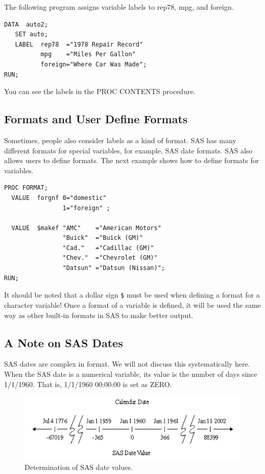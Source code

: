 \documentclass[
]{book}
\begin{document}
The following program assigns variable labels to rep78, mpg, and foreign.

\begin{verbatim}
DATA  auto2;
   SET auto;
   LABEL  rep78  ="1978 Repair Record"
          mpg    ="Miles Per Gallon"
          foreign="Where Car Was Made";
RUN;
\end{verbatim}

You can see the labels in the PROC CONTENTS procedure.

\hypertarget{formats-and-user-define-formats}{%
\subsection{Formats and User Define Formats}\label{formats-and-user-define-formats}}

Sometimes, people also consider labels as a kind of format. SAS has many different formats for special variables, for example, SAS date formats. SAS also allows users to define formats. The next example shows how to define formats for variables.

\begin{verbatim}
PROC FORMAT;
  VALUE  forgnf 0="domestic"
                1="foreign" ;
                
  VALUE  $makef "AMC"    ="American Motors"
                "Buick"  ="Buick (GM)"
                "Cad."   ="Cadillac (GM)"
                "Chev."  ="Chevrolet (GM)"
                "Datsun" ="Datsun (Nissan)";
RUN;
\end{verbatim}

It should be noted that a dollar sign \texttt{\$} must be used when defining a format for a character variable! Once a format of a variable is defined, it will be used the same way as other built-in formats in SAS to make better output.

\hypertarget{a-note-on-sas-dates}{%
\subsection{A Note on SAS Dates}\label{a-note-on-sas-dates}}

SAS dates are complex in format. We will not discuss this systematically here. When the SAS date is a numerical variable, its value is the number of days since 1/1/1960. That is, 1/1/1960 00:00:00 is set as ZERO.

\begin{figure}

{\centering \includegraphics[width=0.6\linewidth]{img03/w03-SAS-Date-Def} 

}

\caption{Determination of SAS date values.}\label{fig:unnamed-chunk-24}
\end{figure}
\end{document}
